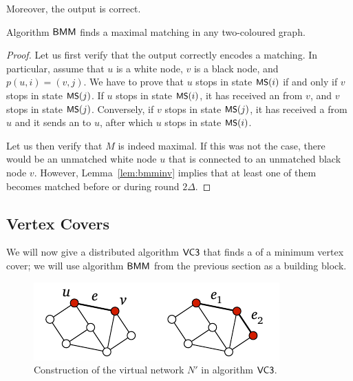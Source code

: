 Moreover, the output is correct.
\begin{lemma}\label{lem:bmm-correct}
    Algorithm $\textsf{BMM}$ finds a maximal matching in any two-coloured graph.
\end{lemma}
\begin{proof}
    Let us first verify that the output correctly encodes a matching. In particular, assume that $u$ is a white node, $v$ is a black node, and $p(u,i) = (v,j)$. We have to prove that $u$ stops in state $\textsf{\small MS}(i)$ if and only if $v$ stops in state $\textsf{\small MS}(j)$. If $u$ stops in state $\textsf{\small MS}(i)$, it has received an  from $v$, and $v$ stops in state $\textsf{\small MS}(j)$. Conversely, if $v$ stops in state $\textsf{\small MS}(j)$, it has received a  from $u$ and it sends an  to $u$, after which $u$ stops in state $\textsf{\small MS}(i)$.
    
    Let us then verify that $M$ is indeed maximal. If this was not the case, there would be an unmatched white node $u$ that is connected to an unmatched black node $v$. However, Lemma~\ref{lem:bmminv} implies that at least one of them becomes matched before or during round $2\Delta$.
\end{proof}

\subsection{Vertex Covers}\label{ssec:vc3}

We will now give a distributed algorithm $\textsf{VC3}$ that finds a  of a minimum vertex cover; we will use algorithm $\textsf{BMM}$ from the previous section as a building block.

\begin{figure}
    \centering
    \includegraphics[page=\PVCThreeApx]{figs.pdf}
    \caption{Construction of the virtual network $N'$ in algorithm $\textsf{VC3}$.}\label{fig:vc3}
\end{figure}

